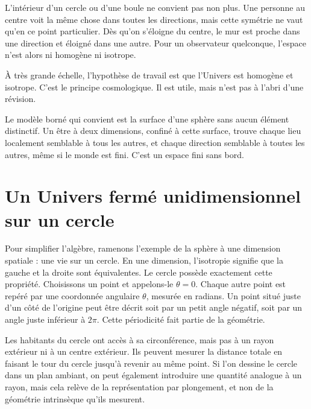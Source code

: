 L’intérieur d’un cercle ou d’une boule ne convient pas non plus. Une personne au centre voit la même chose dans toutes les directions, mais cette symétrie ne vaut qu’en ce point particulier. Dès qu’on s’éloigne du centre, le mur est proche dans une direction et éloigné dans une autre. Pour un observateur quelconque, l’espace n’est alors ni homogène ni isotrope.

À très grande échelle, l’hypothèse de travail est que l’Univers est homogène et isotrope. C’est le principe cosmologique. Il est utile, mais n’est pas à l’abri d’une révision.

\begin{classroomqa}\end{classroomqa}

Le modèle borné qui convient est la surface d’une sphère sans aucun élément distinctif. Un être à deux dimensions, confiné à cette surface, trouve chaque lieu localement semblable à tous les autres, et chaque direction semblable à toutes les autres, même si le monde est fini. C’est un espace fini sans bord.

\section{Un Univers fermé unidimensionnel sur un cercle}

Pour simplifier l’algèbre, ramenons l’exemple de la sphère à une dimension spatiale : une vie sur un cercle. En une dimension, l’isotropie signifie que la gauche et la droite sont équivalentes. Le cercle possède exactement cette propriété. Choisissons un point et appelons-le \(\theta=0\). Chaque autre point est repéré par une coordonnée angulaire \(\theta\), mesurée en radians. Un point situé juste d’un côté de l’origine peut être décrit soit par un petit angle négatif, soit par un angle juste inférieur à \(2\pi\). Cette périodicité fait partie de la géométrie.

Les habitants du cercle ont accès à sa circonférence, mais pas à un rayon extérieur ni à un centre extérieur. Ils peuvent mesurer la distance totale en faisant le tour du cercle jusqu’à revenir au même point. Si l’on dessine le cercle dans un plan ambiant, on peut également introduire une quantité analogue à un rayon, mais cela relève de la représentation par plongement, et non de la géométrie intrinsèque qu’ils mesurent.

